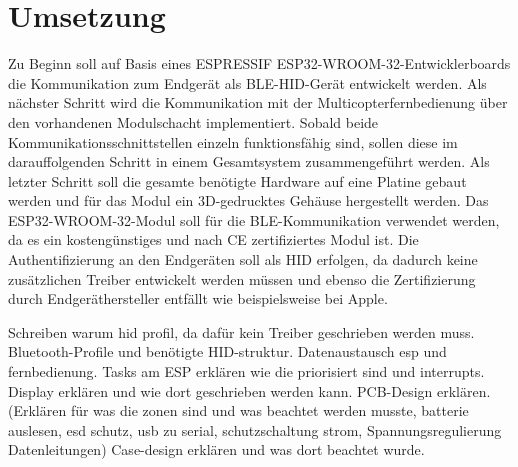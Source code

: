 
\chapter{Umsetzung}

Zu Beginn soll auf Basis eines ESPRESSIF ESP32-WROOM-32-Entwicklerboards die Kommunikation zum Endgerät als BLE-HID-Gerät entwickelt werden. Als nächster Schritt wird die Kommunikation mit
der Multicopterfernbedienung über den vorhandenen Modulschacht implementiert. Sobald beide Kommunikationsschnittstellen einzeln funktionsfähig sind, sollen diese im darauffolgenden Schritt in einem
Gesamtsystem zusammengeführt werden. Als letzter Schritt soll die gesamte benötigte Hardware auf eine Platine gebaut werden und für das Modul ein 3D-gedrucktes Gehäuse hergestellt werden.
Das ESP32-WROOM-32-Modul soll für die BLE-Kommunikation verwendet werden, da es ein kostengünstiges und nach CE zertifiziertes Modul ist. Die Authentifizierung an den Endgeräten soll als HID erfolgen, da dadurch keine zusätzlichen Treiber entwickelt werden müssen und ebenso die Zertifizierung durch Endgeräthersteller entfällt wie beispielsweise bei Apple.

Schreiben warum hid profil, da dafür kein Treiber geschrieben werden muss.
Bluetooth-Profile und benötigte HID-struktur.
Datenaustausch esp und fernbedienung.
Tasks am ESP erklären wie die priorisiert sind und interrupts.
Display erklären und wie dort geschrieben werden kann.
PCB-Design erklären. (Erklären für was die zonen sind und was beachtet werden musste, batterie auslesen, esd schutz, usb zu serial, schutzschaltung strom, Spannungsregulierung Datenleitungen)
Case-design erklären und was dort beachtet wurde.